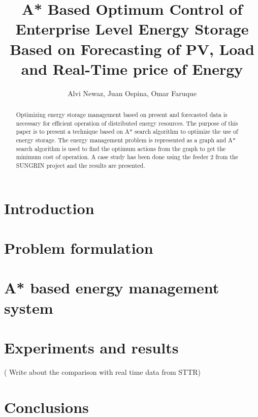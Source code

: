\documentclass[journal]{IEEEtran}
\begin{document}
\title{A* Based Optimum Control of Enterprise Level Energy Storage Based on Forecasting of PV, Load and Real-Time price of Energy}

\author{Alvi Newaz, Juan Ospina, Omar Faruque}






\maketitle                                                               

\begin{abstract}
Optimizing energy storage management based on present and forecasted data is necessary for efficient operation of distributed energy resources. The purpose of this paper is to present a technique based on A* search algorithm \cite{a8book} to optimize the use of energy storage. The energy management problem is represented as a graph and A* search algorithm is used to find the optimum actions from the graph to get the minimum cost of operation. A case study has been done using the feeder 2 from the SUNGRIN project \cite{SUNGRIN} and the results are presented.


\end{abstract}



\IEEEpeerreviewmaketitle



\section{Introduction}


\section{Problem formulation}


\section{A* based energy management system}




\section{Experiments and results}



( Write about the comparison with real time data from STTR)

\section{Conclusions}




\ifCLASSOPTIONcaptionsoff
  \newpage
\fi
\end{document}
